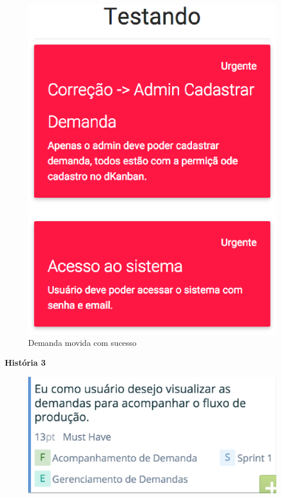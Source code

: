 \begin{figure}[H]
    \centering
	\includegraphics[keepaspectratio=true,scale=0.5]{figuras/sprint6.eps}
    \caption{Demanda movida com sucesso}
    \label{}
\end{figure}


\textbf{História 3}

\begin{figure}[H]
    \centering
	\includegraphics[keepaspectratio=true,scale=0.6]{figuras/sprint8.eps}
    \caption{}
    \label{}
\end{figure}

